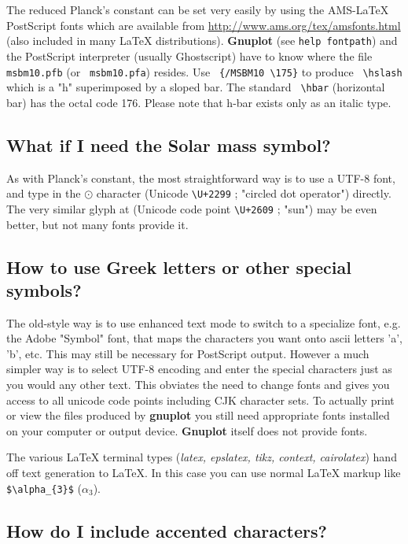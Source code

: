\documentclass[letter,11pt]{article}
\def\http#1{{\small\href{http://#1}{\url{http://#1}}}}
\newcommand{\http}[1]%
            {\htmladdnormallink{\latex{\url{http://#1}}%
                    \html{\textit{http://#1}}}%
                {http://#1}%
            }
\newcommand{\gnuplot}{\textbf{gnuplot }}
\newcommand{\Gnuplot}{\textbf{Gnuplot }}
\begin{document}
{The reduced Planck's constant can be set very easily by using the
AMS-LaTeX PostScript fonts which are available from
\http{www.ams.org/tex/amsfonts.html} (also included in many LaTeX
distributions). \Gnuplot{} (see \verb+help fontpath+) and the
PostScript interpreter (usually Ghostscript) have to know where the
file \verb+ msbm10.pfb+ (or \verb+ msbm10.pfa+) resides. Use
\verb+ {/MSBM10 \175}+ to produce \verb+ \hslash+ which is a "h"
superimposed by a sloped bar. The standard \verb+ \hbar+ (horizontal
bar) has the octal code 176. Please note that h-bar exists only as an
italic type.

\subsection{What if I need the Solar mass symbol?}

As with Planck's constant, the most straightforward way is to use a
UTF-8 font, and type in the $\odot$ character
(Unicode {\verb&\U+2299&} ; "circled dot operator")
directly.  The very similar glyph at (Unicode code point {\verb&\U+2609&} ; "sun")
may be even better, but not many fonts provide it.

\subsection{How to use Greek letters or other special symbols?}

The old-style way is to use enhanced text mode to switch to a specialize font,
e.g. the Adobe "Symbol" font, that maps the characters you want onto ascii
letters 'a', 'b', etc.  This may still be necessary for PostScript output.
However a much simpler way is to select UTF-8 encoding and enter the
special characters just as you would any other text.
This obviates the need to change fonts and gives you access to all unicode
code points including CJK character sets.  To actually print or view the
files produced by \gnuplot you still need appropriate fonts installed on
your computer or output device.  \Gnuplot itself does not provide fonts.

The various \LaTeX{} terminal types (\textit{latex, epslatex, tikz, context, cairolatex})
hand off text generation to \LaTeX{}. In this case you can use normal \LaTeX{}
markup like \verb+$\alpha_{3}$+ ($\alpha_{3}$).

\subsection{How do I include accented characters?}

}
\end{document}
